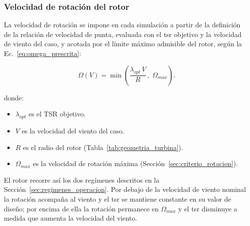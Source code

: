 \subsubsection{Velocidad de rotación del rotor}
\label{sec:giro_prescrito}

La velocidad de rotación se impone en cada simulación a partir de la definición de la relación de velocidad de punta, evaluada con el \gls{tsr} objetivo y la velocidad de viento del caso, y acotada por el límite máximo admisible del rotor, según la Ec.~\ref{eq:omega_prescrita}:

\begin{equation}
    \Omega(V) = \min\left( \frac{\lambda_{opt} \, V}{R} \, , \; \Omega_{max} \right).
    \label{eq:omega_prescrita}
\end{equation}

donde:
\begin{itemize}
    \item $\lambda_{opt}$ es el TSR objetivo.
    \item $V$ es la velocidad del viento del caso.
    \item $R$ es el radio del rotor (Tabla~\ref{tab:geometria_turbina}).
    \item $\Omega_{max}$ es la velocidad de rotación máxima (Sección~\ref{sec:criterio_rotacion}).
\end{itemize}

El rotor recorre así los dos regímenes descritos en la Sección~\ref{sec:regimenes_operacion}. Por debajo de la velocidad de viento nominal la rotación acompaña al viento y el \gls{tsr} se mantiene constante en su valor de diseño; por encima de ella la rotación permanece en $\Omega_{max}$ y el \gls{tsr} disminuye a medida que aumenta la velocidad del viento.

